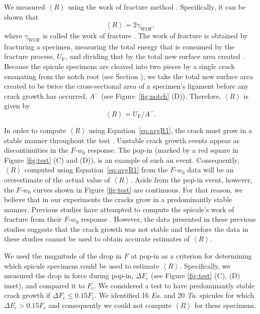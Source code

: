 \documentclass[12pt,onecolumn]{article}
\makeatletter
\DeclareRobustCommand*{\nameref}[1]{%
      \emph{\myorg@nameref{#1}}%
    }%
\newcommand{\TA}{\textit{Ta.\@}\xspace}
\newcommand{\EA}{\textit{Ea.\@}\xspace}
\makeatother
\begin{document}
We measured $\left< R\right>$ using the work of fracture method \cite{nakayama1981crack,sakai1992work}. Specifically, it can be shown that 
%
\begin{equation}
    \label{eq:Rwof}
    \left< R \right>=2 \gamma_\mathrm{WOF},
\end{equation}
%
where $\gamma_\mathrm{WOF}$ is called the work of fracture \cite{sakai1992work}. The work of fracture is obtained by fracturing a specimen, measuring the total energy that is consumed by the fracture process, $U_\mathrm{F}$, and dividing that by the total new surface area created \cite{nakayama1981crack}. Because the spicule specimens are cleaved into two pieces by a single crack emanating from the notch root (see Section \nameref{sec:fracto}), we take the total new surface area created to be twice the cross-sectional area of a specimen's ligament before any crack growth has occurred, $A^-$ (see Figure~\ref{fig:notch} (D)). Therefore, $\left< R \right>$ is given by 
%
\begin{equation}
    \label{eq:avgR1}
    \left< R \right> = U_\mathrm{F}/A^-.
\end{equation}
%

In order to compute $\left< R \right>$ using Equation~\eqref{eq:avgR1}, the crack must grow in a stable manner throughout the test \cite{tattersall1966work,davidge1968effective}. Unstable crack growth events appear as discontinuities in the $F$-$w_0$ response. The pop-in (marked by a red square in Figure \ref{fig:test} (C) and (D)), is an example of such an event. Consequently, $\left< R \right>$ computed using Equation~\eqref{eq:avgR1} from the $F$-$w_0$ data will be an overestimate of the actual value of $\left< R \right>$. Aside from the pop-in event, however, the $F$-$w_0$ curves shown in Figure \ref{fig:test} are continuous. For that reason, we believe that in our experiments the cracks grow in a predominantly stable manner. Previous studies have attempted to compute the spicule's work of fracture from their $F$-$w_0$ response \cite{walter2007mechanisms, mayer2005rigid}. However, the data presented in these previous studies suggests that the crack growth was not stable and therefore the data in these studies cannot be used to obtain accurate estimates of $\left< R \right>$. 

We used the magnitude of the drop in $F$ at pop-in as a criterion for determining which spicule specimens could be used to estimate $\left< R\right>$. Specifically, we measured the drop in force during pop-in, $\Delta F_\mathrm{c}$ (see Figure \ref{fig:test} (C), (D) inset), and compared it to $F_\mathrm{c}$. We considered a test to have predominantly stable crack growth if $\Delta F_\mathrm{c} \leq 0.15 F_\mathrm{c}$. We identified 16 \EA and 20 \TA spicules for which $\Delta F_\mathrm{c} > 0.15 F_\mathrm{c}$ and consequently we could not compute $\left< R \right>$ for these specimens.
\end{document}
